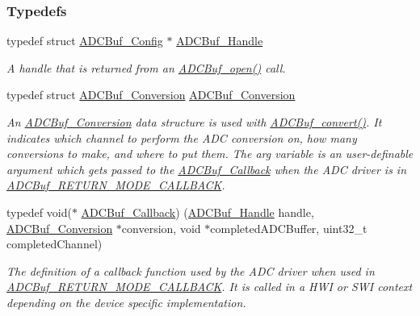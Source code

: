 \subsubsection*{Typedefs}
\begin{DoxyCompactItemize}
\item 
typedef struct \hyperlink{struct_a_d_c_buf___config}{A\+D\+C\+Buf\+\_\+\+Config} $\ast$ \hyperlink{_a_d_c_buf_8h_a9b9646efcf7a7fd38a2935abd940cf96}{A\+D\+C\+Buf\+\_\+\+Handle}
\begin{DoxyCompactList}\small\item\em A handle that is returned from an \hyperlink{_a_d_c_buf_8h_a0b63bca2e8f8e5b58f0c657ac662c97b}{A\+D\+C\+Buf\+\_\+open()} call. \end{DoxyCompactList}\item 
typedef struct \hyperlink{struct_a_d_c_buf___conversion}{A\+D\+C\+Buf\+\_\+\+Conversion} \hyperlink{_a_d_c_buf_8h_af4e6495373ac4fb3c86d3c40be779ecc}{A\+D\+C\+Buf\+\_\+\+Conversion}
\begin{DoxyCompactList}\small\item\em An \hyperlink{struct_a_d_c_buf___conversion}{A\+D\+C\+Buf\+\_\+\+Conversion} data structure is used with \hyperlink{_a_d_c_buf_8h_a762253a94875258c5a71b591f03f9d97}{A\+D\+C\+Buf\+\_\+convert()}. It indicates which channel to perform the A\+D\+C conversion on, how many conversions to make, and where to put them. The arg variable is an user-\/definable argument which gets passed to the \hyperlink{_a_d_c_buf_8h_a477c377c65f8de04aa67ff7eefa0a4cf}{A\+D\+C\+Buf\+\_\+\+Callback} when the A\+D\+C driver is in \hyperlink{_a_d_c_buf_8h_a3d643e8024503c5ef2679c83419ba6eea633b4b063b88d7c62e9e2513075a36a7}{A\+D\+C\+Buf\+\_\+\+R\+E\+T\+U\+R\+N\+\_\+\+M\+O\+D\+E\+\_\+\+C\+A\+L\+L\+B\+A\+C\+K}. \end{DoxyCompactList}\item 
typedef void($\ast$ \hyperlink{_a_d_c_buf_8h_a477c377c65f8de04aa67ff7eefa0a4cf}{A\+D\+C\+Buf\+\_\+\+Callback}) (\hyperlink{_a_d_c_buf_8h_a9b9646efcf7a7fd38a2935abd940cf96}{A\+D\+C\+Buf\+\_\+\+Handle} handle, \hyperlink{struct_a_d_c_buf___conversion}{A\+D\+C\+Buf\+\_\+\+Conversion} $\ast$conversion, void $\ast$completed\+A\+D\+C\+Buffer, uint32\+\_\+t completed\+Channel)
\begin{DoxyCompactList}\small\item\em The definition of a callback function used by the A\+D\+C driver when used in \hyperlink{_a_d_c_buf_8h_a3d643e8024503c5ef2679c83419ba6eea633b4b063b88d7c62e9e2513075a36a7}{A\+D\+C\+Buf\+\_\+\+R\+E\+T\+U\+R\+N\+\_\+\+M\+O\+D\+E\+\_\+\+C\+A\+L\+L\+B\+A\+C\+K}. It is called in a H\+W\+I or S\+W\+I context depending on the device specific implementation. \end{DoxyCompactList}\item 

\end{DoxyCompactItemize}
